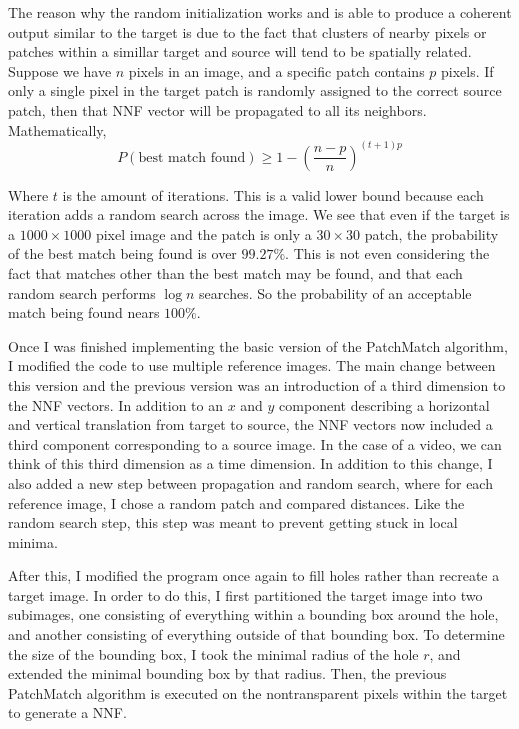 The reason why the random initialization works and is able to produce a coherent output similar to the target is due to the fact that clusters of nearby pixels or patches within a simillar target and source will tend to be spatially related. Suppose we have $n$ pixels in an image, and a specific patch contains $p$ pixels. If only a single pixel in the target patch is randomly assigned to the correct source patch, then that NNF vector will be propagated to all its neighbors. Mathematically,
$$P(\text{best match found}) \ge 1 - \left(\frac {n-p}n\right)^{(t+1)p}$$

Where $t$ is the amount of iterations. This is a valid lower bound because each iteration adds a random search across the image. We see that even if the target is a $1000\times1000$ pixel image and the patch is only a $30\times30$ patch, the probability of the best match being found is over $99.27\%$. This is not even considering the fact that matches other than the best match may be found, and that each random search performs $\log n$ searches. So the probability of an acceptable match being found nears $100\%$.

Once I was finished implementing the basic version of the PatchMatch algorithm, I modified the code to use multiple reference images. The main change between this version and the previous version was an introduction of a third dimension to the NNF vectors. In addition to an $x$ and $y$ component describing a horizontal and vertical translation from target to source, the NNF vectors now included a third component corresponding to a source image. In the case of a video, we can think of this third dimension as a time dimension. In addition to this change, I also added a new step between propagation and random search, where for each reference image, I chose a random patch and compared distances. Like the random search step, this step was meant to prevent getting stuck in local minima.

After this, I modified the program once again to fill holes rather than recreate a target image. In order to do this, I first partitioned the target image into two subimages, one consisting of everything within a bounding box around the hole, and another consisting of everything outside of that bounding box. To determine the size of the bounding box, I took the minimal radius of the hole $r$, and extended the minimal bounding box by that radius. Then, the previous PatchMatch algorithm is executed on the nontransparent pixels within the target to generate a NNF.


